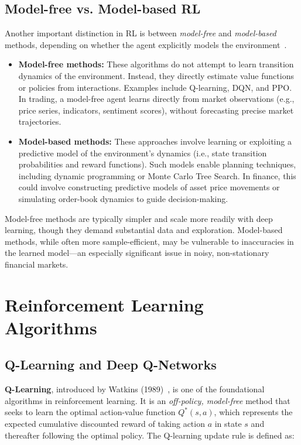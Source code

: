 \documentclass[12pt,a4paper]{report}
\begin{document}
\subsection{Model-free vs. Model-based RL}

Another important distinction in RL is between \textit{model-free} and \textit{model-based} methods, depending on whether the agent explicitly models the environment~\cite{sutton2018reinforcement}.

\begin{itemize}
    \item \textbf{Model-free methods:} These algorithms do not attempt to learn transition dynamics of the environment. Instead, they directly estimate value functions or policies from interactions. Examples include Q-learning, DQN, and PPO. In trading, a model-free agent learns directly from market observations (e.g., price series, indicators, sentiment scores), without forecasting precise market trajectories.
    
    \item \textbf{Model-based methods:} These approaches involve learning or exploiting a predictive model of the environment’s dynamics (i.e., state transition probabilities and reward functions). Such models enable planning techniques, including dynamic programming or Monte Carlo Tree Search. In finance, this could involve constructing predictive models of asset price movements or simulating order-book dynamics to guide decision-making.
\end{itemize}

Model-free methods are typically simpler and scale more readily with deep learning, though they demand substantial data and exploration. Model-based methods, while often more sample-efficient, may be vulnerable to inaccuracies in the learned model—an especially significant issue in noisy, non-stationary financial markets.



\section{Reinforcement Learning Algorithms}

\subsection{Q-Learning and Deep Q-Networks}

\textbf{Q-Learning}, introduced by Watkins (1989)~\cite{watkins1989q}, is one of the foundational algorithms in reinforcement learning. It is an \textit{off-policy, model-free} method that seeks to learn the optimal action-value function $Q^*(s, a)$, which represents the expected cumulative discounted reward of taking action $a$ in state $s$ and thereafter following the optimal policy. The Q-learning update rule is defined as:
\end{document}
